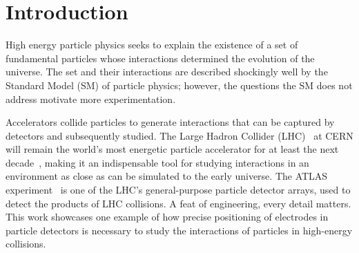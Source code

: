 
\chapter{Introduction}
\label{chap:intro}



High energy particle physics seeks to explain the existence of a set of fundamental particles whose interactions determined the evolution of the universe. The set and their interactions are described shockingly well by the Standard Model (SM) of particle physics; however, the questions the SM does not address motivate more experimentation. 

Accelerators collide particles to generate interactions that can be captured by detectors and subsequently studied. The Large Hadron Collider (LHC)~\cite{evans_lhc_2008} at CERN will remain the world's most energetic particle accelerator for at least the next decade~\cite{hl_lhc_tdr}, making it an indispensable tool for studying interactions in an environment as close as can be simulated to the early universe. The ATLAS experiment~\cite{collaboration_atlas_2008} is one of the LHC's general-purpose particle detector arrays, used to detect the products of LHC collisions. A feat of engineering, every detail matters. This work showcases one example of how precise positioning of electrodes in particle detectors is necessary to study the interactions of particles in high-energy collisions.

